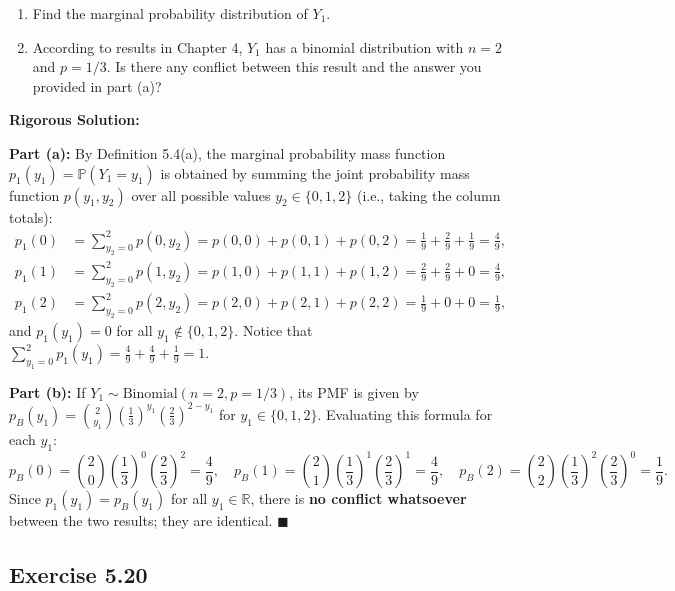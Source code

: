 \documentclass[11pt, letterpaper]{article}
\theoremstyle{definition}
\theoremstyle{remark}
\newcommand{\Prob}{\mathbb{P}}
\begin{document}
\begin{enumerate}[label=\textbf{\alph*}]
    \item Find the marginal probability distribution of $Y_1$.
    \item According to results in Chapter 4, $Y_1$ has a binomial distribution with $n = 2$ and $p = 1/3$. Is there any conflict between this result and the answer you provided in part (a)?
\end{enumerate}

\textbf{Rigorous Solution:}

\textbf{Part (a):} By Definition 5.4(a), the marginal probability mass function $p_1(y_1) = \Prob(Y_1 = y_1)$ is obtained by summing the joint probability mass function $p(y_1, y_2)$ over all possible values $y_2 \in \{0, 1, 2\}$ (i.e., taking the column totals):
\begin{align*}
    p_1(0) &= \sum_{y_2=0}^2 p(0, y_2) = p(0, 0) + p(0, 1) + p(0, 2) = \frac{1}{9} + \frac{2}{9} + \frac{1}{9} = \frac{4}{9}, \\
    p_1(1) &= \sum_{y_2=0}^2 p(1, y_2) = p(1, 0) + p(1, 1) + p(1, 2) = \frac{2}{9} + \frac{2}{9} + 0 = \frac{4}{9}, \\
    p_1(2) &= \sum_{y_2=0}^2 p(2, y_2) = p(2, 0) + p(2, 1) + p(2, 2) = \frac{1}{9} + 0 + 0 = \frac{1}{9},
\end{align*}
and $p_1(y_1) = 0$ for all $y_1 \notin \{0, 1, 2\}$. Notice that $\sum_{y_1=0}^2 p_1(y_1) = \frac{4}{9} + \frac{4}{9} + \frac{1}{9} = 1$.

\textbf{Part (b):} If $Y_1 \sim \text{Binomial}(n = 2, p = 1/3)$, its PMF is given by $p_B(y_1) = \binom{2}{y_1} \left(\frac{1}{3}\right)^{y_1} \left(\frac{2}{3}\right)^{2 - y_1}$ for $y_1 \in \{0, 1, 2\}$. Evaluating this formula for each $y_1$:
\[ p_B(0) = \binom{2}{0}\left(\frac{1}{3}\right)^0\left(\frac{2}{3}\right)^2 = \frac{4}{9}, \quad p_B(1) = \binom{2}{1}\left(\frac{1}{3}\right)^1\left(\frac{2}{3}\right)^1 = \frac{4}{9}, \quad p_B(2) = \binom{2}{2}\left(\frac{1}{3}\right)^2\left(\frac{2}{3}\right)^0 = \frac{1}{9}. \]
Since $p_1(y_1) = p_B(y_1)$ for all $y_1 \in \mathbb{R}$, there is \textbf{no conflict whatsoever} between the two results; they are identical. $\blacksquare$

\subsection{Exercise 5.20}
\end{document}
